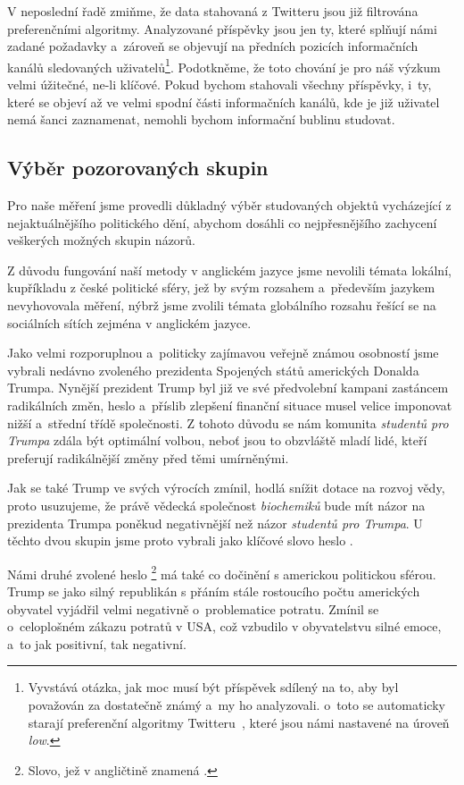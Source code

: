 \documentclass[12pt, a4paper]{article}
\numberwithin{equation}{section} 	%
\begin{document}
V neposlední řadě zmiňme, že data stahovaná z Twitteru jsou již filtrována preferenčními algoritmy. Analyzované příspěvky jsou jen ty, které splňují námi zadané požadavky a~zároveň se objevují na předních pozicích informačních kanálů sledovaných uživatelů\footnote{Vyvstává otázka, jak moc musí být příspěvek sdílený na to, aby byl považován za dostatečně známý a~my ho analyzovali. o~toto se automaticky starají preferenční algoritmy Twitteru~\cite{twitterAPI}, které jsou námi nastavené na úroveň \textit{low}.}. Podotkněme, že toto chování je pro náš výzkum velmi úžitečné, ne-li klíčové. Pokud bychom stahovali všechny příspěvky, i~ty, které se objeví až ve velmi spodní části informačních kanálů, kde je již uživatel nemá šanci zaznamenat, nemohli bychom informační bublinu studovat.

\subsection{Výběr pozorovaných skupin}
\noindent Pro naše měření jsme provedli důkladný výběr studovaných objektů vycházející z nejaktuálnějšího politického dění, abychom dosáhli co nejpřesnějšího zachycení veškerých možných skupin názorů.

Z důvodu fungování naší metody v anglickém jazyce jsme nevolili témata lokální, kupříkladu z české politické sféry, jež by svým rozsahem a~především jazykem nevyhovovala měření, nýbrž jsme zvolili témata globálního rozsahu řešící se na sociálních sítích zejména v anglickém jazyce.

Jako velmi rozporuplnou a~politicky zajímavou veřejně známou osobností jsme vybrali nedávno zvoleného prezidenta Spojených států amerických Donalda Trumpa. Nynější prezident Trump byl již ve své předvolební kampani zastáncem radikálních změn, heslo  a~příslib zlepšení finanční situace musel velice imponovat nižší a~střední třídě společnosti. Z tohoto důvodu se nám komunita \textit{studentů pro Trumpa} zdála být optimální volbou, neboť jsou to obzvláště mladí lidé, kteří preferují radikálnější změny před těmi umírněnými.

Jak se také Trump ve svých výrocích zmínil, hodlá snížit dotace na rozvoj vědy, proto usuzujeme, že právě vědecká společnost \textit{biochemiků} bude mít názor na prezidenta Trumpa poněkud negativnější než názor \textit{studentů pro Trumpa}. U těchto dvou skupin jsme proto vybrali jako klíčové slovo heslo \textit{}.

Námi druhé zvolené heslo \textit{}\footnote{Slovo, jež v angličtině znamená \textit{}.} má také co dočinění s americkou politickou sférou. Trump se jako silný republikán s přáním stále rostoucího počtu amerických obyvatel vyjádřil velmi negativně o~problematice potratu. Zmínil se o~celoplošném zákazu potratů v USA, což vzbudilo v obyvatelstvu silné emoce, a~to jak positivní, tak negativní.
\end{document}
